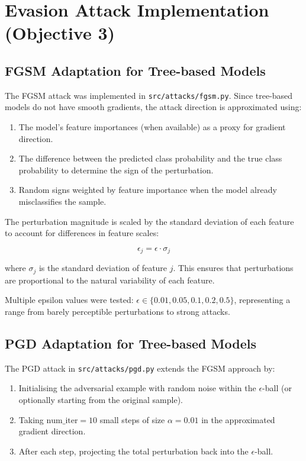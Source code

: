 \documentclass[12pt,a4paper,oneside]{report}
\begin{document}
\section{Evasion Attack Implementation (Objective 3)}

\subsection{FGSM Adaptation for Tree-based Models}

The FGSM attack was implemented in \texttt{src/attacks/fgsm.py}. Since tree-based models do not have smooth gradients, the attack direction is approximated using:
\begin{enumerate}
    \item The model's feature importances (when available) as a proxy for gradient direction.
    \item The difference between the predicted class probability and the true class probability to determine the sign of the perturbation.
    \item Random signs weighted by feature importance when the model already misclassifies the sample.
\end{enumerate}

The perturbation magnitude is scaled by the standard deviation of each feature to account for differences in feature scales:

\begin{equation}
    \label{eq:fgsm_eps}
    \epsilon_j = \epsilon \cdot \sigma_j
\end{equation}

\noindent where $\sigma_j$ is the standard deviation of feature $j$. This ensures that perturbations are proportional to the natural variability of each feature.

Multiple epsilon values were tested: $\epsilon \in \{0.01, 0.05, 0.1, 0.2, 0.5\}$, representing a range from barely perceptible perturbations to strong attacks.

\subsection{PGD Adaptation for Tree-based Models}

The PGD attack in \texttt{src/attacks/pgd.py} extends the FGSM approach by:
\begin{enumerate}
    \item Initialising the adversarial example with random noise within the $\epsilon$-ball (or optionally starting from the original sample).
    \item Taking $\text{num\_iter} = 10$ small steps of size $\alpha = 0.01$ in the approximated gradient direction.
    \item After each step, projecting the total perturbation back into the $\epsilon$-ball.
\end{enumerate}
\end{document}
